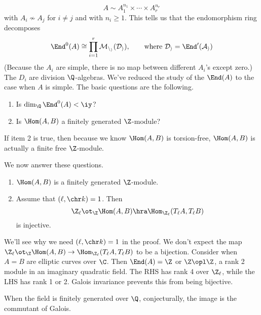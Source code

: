 \[
A\sim A_1^{n_1}\times \cdots \times A_r^{n_r}
\]
with $A_i\nsim A_j$ for $i\ne j$ and with $n_i\ge 1$. This tells us that the endomorphism ring decomposes
\[
\End^0(A)\cong \prod_{i=1}^r \cal M_{n_i}(D_i),\qquad \text{where }D_i=\End^0(A_i)
\]
(Because the $A_i$ are simple, there is no map between different $A_i$'s except zero.)
The $D_i$ are division $\Q$-algebras. We've reduced the study of the $\End(A)$ to the case when $A$ is simple. 
The basic questions are the following.
\begin{enumerate}
\item
Is $\dim_{\Q} \End^0(A)<\iy$?
\item
Is $\Hom(A,B)$ a finitely generated $\Z$-module?
\end{enumerate}
If item 2 is true, then because we know $\Hom(A,B)$ is torsion-free, $\Hom(A,B)$ is actually a finite free $\Z$-module.

We now answer these questions.
\begin{thm}
\begin{enumerate}
\item
$\Hom(A,B)$ is a finitely generated $\Z$-module.
\item
Assume that $(\ell,\chr k)=1$. Then 
\[
\Z_{\ell}\ot_{\Z}\Hom(A,B)\hra\Hom_{\Z_{\ell}}(T_{\ell}A,T_{\ell}B)
\]
is injective. 
\end{enumerate}
\end{thm}
We'll see why we need $(\ell,\chr k)=1$ in the proof. %
We don't expect the map $\Z_{\ell}\ot_{\Z}\Hom(A,B)\to\Hom_{\Z_{\ell}}(T_{\ell}A,T_{\ell}B)$ to be a bijection. Consider when $A=B$ are elliptic curves over $\C$. Then $\End(A)=\Z$ or $\Z\opl \Z$, a rank 2 module in an imaginary quadratic field. The RHS has rank 4 over $\Z_{\ell}$, while the LHS has rank 1 or 2. Galois invariance prevents this from being bijective.

When the field is finitely generated over $\Q$, conjecturally, the image is the commutant of Galois.

